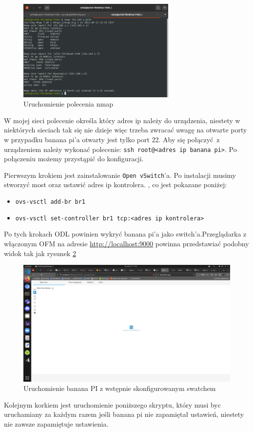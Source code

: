 \documentclass[12pt,a4paper,twoside]{article}
\newcounter{rok}
\begin{document}
\begin{figure}[!h]
	\centering\includegraphics[width=0.7\textwidth]{nmap.jpg}
	\caption{Uruchomienie polecenia nmap} \label{nmap}
\end{figure}

W mojej sieci polecenie określa który adres ip należy do urządzenia, niestety w niektórych sieciach tak się nie dzieje więc trzeba zwracać uwagę na otwarte porty w przypadku banana pi'a  otwarty jest tylko port 22. Aby się połączyć z urządzeniem należy wykonać polecenie: \texttt{ssh root@<adres ip banana pi>}. Po połączeniu możemy przystąpić do konfiguracji. 
\par Pierwszym krokiem jest zainstalowanie \texttt{Open vSwitch}'a. Po instalacji musimy stworzyć most oraz ustawić adres ip kontrolera. , co jest pokazane poniżej:
\begin{itemize}
	\item\texttt{ovs-vsctl add-br br1}  
	\item\texttt{ovs-vsctl set-controller br1 tcp:<adres ip kontrolera>}
\end{itemize}

Po tych krokach ODL powinien wykryć banana pi'a jako switch'a.Przeglądarka z włączonym OFM na adresie \url{http://localhost:9000} powinna przedstawiać podobny widok tak jak rysunek \ref{OFM_banana}
 
 \begin{figure}[!h]
 	\centering\includegraphics[width=1\textwidth]{OFM_banana.jpg}
 	\caption{Uruchomienie banana PI z wstępnie skonfigurowanym swatchem } \label{OFM_banana}
 \end{figure}
 \newpage
\par Kolejnym korkiem jest uruchomienie poniższego skryptu, który musi byc uruchamiany za każdym razem jeśli banana pi nie zapamiętał ustawień, niestety nie zawsze zapamiętuje ustawienia. 
\end{document}
